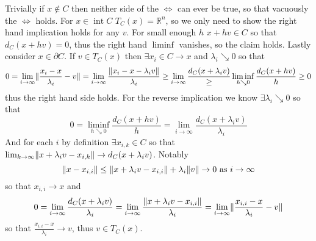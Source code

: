 \documentclass{article}
\newenvironment{ex}[1]
  {\renewcommand\theexercise{#1}\exercise}
  {\endexercise}
\DeclareMathOperator*{\inte}{int}
\newcommand{\R}[1]{\mathbb{R}^{#1}}
\begin{document}
\begin{ex}{10.17} %
  Trivially if $x \not\in C$ then neither side of the $\iff$ can ever be true, so that vacuously the $\iff$ holds. For $x \in \inte C$ $T_C(x) = \R{n}$, so we only need to show the right hand implication holds for any $v$. For small enough $h$ $x + hv \in C$ so that $d_C(x + hv) = 0$, thus the right hand $\liminf$ vanishes, so the claim holds. Lastly consider $x \in \partial C$. If $v \in T_C(x)$ then $\exists x_i \in C \to x$ and $\lambda_i \searrow 0$ so that
  $$
  0 = \lim_{i \to \infty} \lVert\frac{x_i - x}{\lambda_i} - v\rVert = \lim_{i \to \infty} \frac{\lVert x_i - x - \lambda_iv\rVert}{\lambda_i} \ge \lim_{i \to \infty} \frac{d_C(x + \lambda_i v)} \ge \liminf_{h \searrow 0} \frac{d_C(x + hv)}{h} \ge 0
  $$
  thus the right hand side holds. For the reverse implication we know $\exists \lambda_i \searrow 0$ so that
  $$
  0 = \liminf_{h \searrow 0} \frac{d_C(x + hv)}{h} = \lim_{i \to \infty} \frac{d_C(x + \lambda_i v)}{\lambda_i}
  $$
  And for each $i$ by definition $\exists x_{i,k} \in C$ so that $\lim_{k \to \infty} \lVert x + \lambda_i v - x_{i,k}\rVert \to d_C(x+ \lambda_i v)$. Notably
  $$
  \lVert x - x_{i,i}\rVert \le \lVert x + \lambda_i v - x_{i, i}\rVert + \lambda_i \lVert v\rVert \to 0 \text{ as } i \to \infty
  $$
  so that $x_{i, i} \to x$ and
  $$
  0 = \lim_{i \to \infty} \frac{d_C(x + \lambda_i v)}{\lambda_i} = \lim_{i \to \infty} \frac{\lVert x + \lambda_i v - x_{i,i}\rVert}{\lambda_i} = \lim_{i \to \infty} \lVert\frac{x_{i,i} - x}{\lambda_i} - v\rVert
  $$
  so that $\frac{x_{i,i} - x}{\lambda_i} \to v$, thus $v \in T_C(x)$.
\end{ex} %
\end{document}
